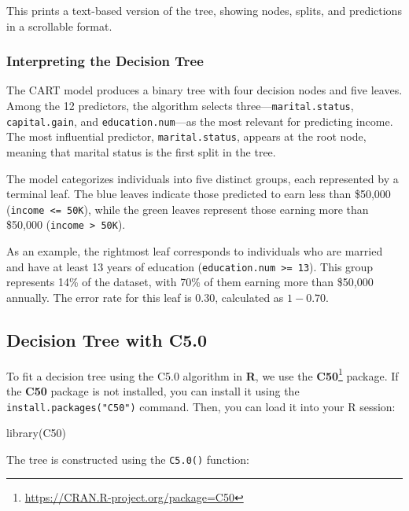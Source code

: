 \documentclass[
  11pt,
]{book}
\makeatletter
\newenvironment{Shaded}{}{}
\newcommand{\FunctionTok}[1]{#1}
\newcommand{\NormalTok}[1]{#1}
\renewcommand{\href}[2]{#2\footnote{\url{#1}}}
\newenvironment{kframe}{%
\medskip{}
\setlength{\fboxsep}{.8em}
 \def\at@end@of@kframe{}%
 \ifinner\ifhmode%
  \def\at@end@of@kframe{\end{minipage}}%
  \begin{minipage}{\columnwidth}%
 \fi\fi%
 \def\FrameCommand##1{\hskip\@totalleftmargin \hskip-\fboxsep
 \colorbox{shadecolor}{##1}\hskip-\fboxsep
     \hskip-\linewidth \hskip-\@totalleftmargin \hskip\columnwidth}%
 \MakeFramed {\advance\hsize-\width
   \@totalleftmargin\z@ \linewidth\hsize
   \@setminipage}}%
 {\par\unskip\endMakeFramed%
 \at@end@of@kframe}
\renewenvironment{Shaded}{\begin{kframe}}{\end{kframe}}
\theoremstyle{definition}
\theoremstyle{definition}
\theoremstyle{definition}
\theoremstyle{definition}
\theoremstyle{remark}
\makeatother
\begin{document}
This prints a text-based version of the tree, showing nodes, splits, and predictions in a scrollable format.

\subsubsection*{Interpreting the Decision Tree}\label{interpreting-the-decision-tree}


The CART model produces a binary tree with four decision nodes and five leaves. Among the 12 predictors, the algorithm selects three---\texttt{marital.status}, \texttt{capital.gain}, and \texttt{education.num}---as the most relevant for predicting income. The most influential predictor, \texttt{marital.status}, appears at the root node, meaning that marital status is the first split in the tree.

The model categorizes individuals into five distinct groups, each represented by a terminal leaf. The blue leaves indicate those predicted to earn less than \$50,000 (\texttt{income\ \textless{}=\ 50K}), while the green leaves represent those earning more than \$50,000 (\texttt{income\ \textgreater{}\ 50K}).

As an example, the rightmost leaf corresponds to individuals who are married and have at least 13 years of education (\texttt{education.num\ \textgreater{}=\ 13}). This group represents 14\% of the dataset, with 70\% of them earning more than \$50,000 annually. The error rate for this leaf is 0.30, calculated as \(1 - 0.70\).

\subsection*{Decision Tree with C5.0}\label{decision-tree-with-c5.0}


To fit a decision tree using the C5.0 algorithm in \textbf{R}, we use the \href{https://CRAN.R-project.org/package=C50}{\textbf{C50}} package. If the \textbf{C50} package is not installed, you can install it using the \texttt{install.packages("C50")} command. Then, you can load it into your R session:

\begin{Shaded}
\begin{Highlighting}[]
\FunctionTok{library}\NormalTok{(C50)}
\end{Highlighting}
\end{Shaded}

The tree is constructed using the \texttt{C5.0()} function:
\end{document}
